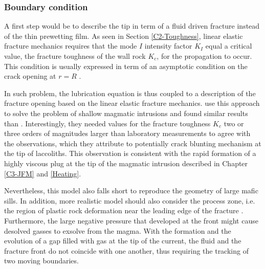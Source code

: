 \subsubsection*{Boundary condition}

A first step  would be to describe  the tip in term of  a fluid driven
fracture  instead of  the thin  prewetting  film. As  seen in  Section
\ref{C2-Toughness},  linear elastic  fracture mechanics  requires that
the  mode $I$  intensity  factor  $K_I$ equal  a  critical value,  the
fracture toughness  of the wall  rock $K_{c}$, for the  propagation to
occur.  This condition  is usually expressed in term  of an asymptotic
condition      on      the       crack      opening      at      $r=R$
\citep{Savitski:2002gy,Bunger:2005em,Bunger:2007vs,Detournay:2014fk}.

In  such  problem, the  lubrication  equation  is  thus coupled  to  a
description  of  the fracture  opening  based  on the  linear  elastic
fracture mechanics.  \citet{Bunger:2011cb} use  this approach to solve
the problem of  shallow magmatic intrusions and  found similar results
than  \citet{Michaut:2011kg}.  Interestingly,  they needed  values for
the fracture toughness $K_c$ two  or three orders of magnitudes larger
than  laboratory measurements  to agree  with the  observations, which
they attribute to  potentially crack blunting mechanism at  the tip of
laccoliths.  This  observation is consistent with  the rapid formation
of  a  highly viscous  plug  at  the  tip  of the  magmatic  intrusion
described in Chapter \ref{C3-JFM} and \ref{Heating}.

Nevertheless, this model also falls short to reproduce the geometry of
large  mafic sills.   In addition,  more realistic  model should  also
consider the process zone, i.e. the region of plastic rock deformation
near       the      leading       edge      of       the      fracture
\citep{Bunger:2008cl}. Furthermore,  the large negative  pressure that
developed at the front might cause desolved gasses to exsolve from the
magma.  With the formation and the  evolution of a gap filled with gas
at the  tip of the  current, the fluid and  the fracture front  do not
coincide with one  another, thus requiring the tracking  of two moving
boundaries.

